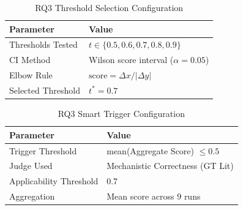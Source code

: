 \begin{table}[H]
\centering
\caption{RQ3 Threshold Selection Configuration}
\label{tab:rq3_threshold_config}
\footnotesize
\begin{tabular}{@{}ll@{}}
\toprule
\textbf{Parameter} & \textbf{Value} \\
\midrule
Thresholds Tested & $t \in \{0.5, 0.6, 0.7, 0.8, 0.9\}$ \\
CI Method & Wilson score interval ($\alpha=0.05$) \\
Elbow Rule & $\text{score} = \Delta x / |\Delta y|$ \\
Selected Threshold & $t^* = 0.7$ \\
\bottomrule
\end{tabular}
\end{table}

\begin{table}[H]
\centering
\caption{RQ3 Smart Trigger Configuration}
\label{tab:rq3_smart_trigger_config}
\footnotesize
\begin{tabular}{@{}ll@{}}
\toprule
\textbf{Parameter} & \textbf{Value} \\
\midrule
Trigger Threshold & mean(Aggregate Score) $\leq 0.5$ \\
Judge Used & Mechanistic Correctness (GT Lit) \\
Applicability Threshold & 0.7 \\
Aggregation & Mean score across 9 runs \\
\bottomrule
\end{tabular}
\end{table}

